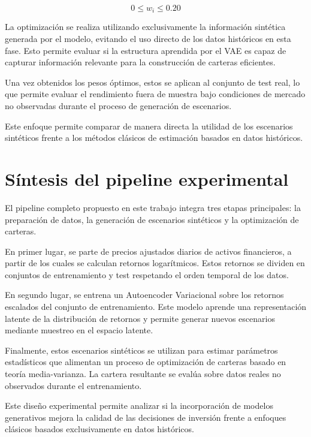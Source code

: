 \begin{equation}
0 \leq w_i \leq 0.20
\end{equation}

La optimización se realiza utilizando exclusivamente la información sintética generada por el modelo, evitando el uso directo de los datos históricos en esta fase. Esto permite evaluar si la estructura aprendida por el VAE es capaz de capturar información relevante para la construcción de carteras eficientes.

Una vez obtenidos los pesos óptimos, estos se aplican al conjunto de test real, lo que permite evaluar el rendimiento fuera de muestra bajo condiciones de mercado no observadas durante el proceso de generación de escenarios.

Este enfoque permite comparar de manera directa la utilidad de los escenarios sintéticos frente a los métodos clásicos de estimación basados en datos históricos.

\section{Síntesis del pipeline experimental}

El pipeline completo propuesto en este trabajo integra tres etapas principales: la preparación de datos, la generación de escenarios sintéticos y la optimización de carteras.

En primer lugar, se parte de precios ajustados diarios de activos financieros, a partir de los cuales se calculan retornos logarítmicos. Estos retornos se dividen en conjuntos de entrenamiento y test respetando el orden temporal de los datos.

En segundo lugar, se entrena un Autoencoder Variacional sobre los retornos escalados del conjunto de entrenamiento. Este modelo aprende una representación latente de la distribución de retornos y permite generar nuevos escenarios mediante muestreo en el espacio latente.

Finalmente, estos escenarios sintéticos se utilizan para estimar parámetros estadísticos que alimentan un proceso de optimización de carteras basado en teoría media-varianza. La cartera resultante se evalúa sobre datos reales no observados durante el entrenamiento.

Este diseño experimental permite analizar si la incorporación de modelos generativos mejora la calidad de las decisiones de inversión frente a enfoques clásicos basados exclusivamente en datos históricos.

